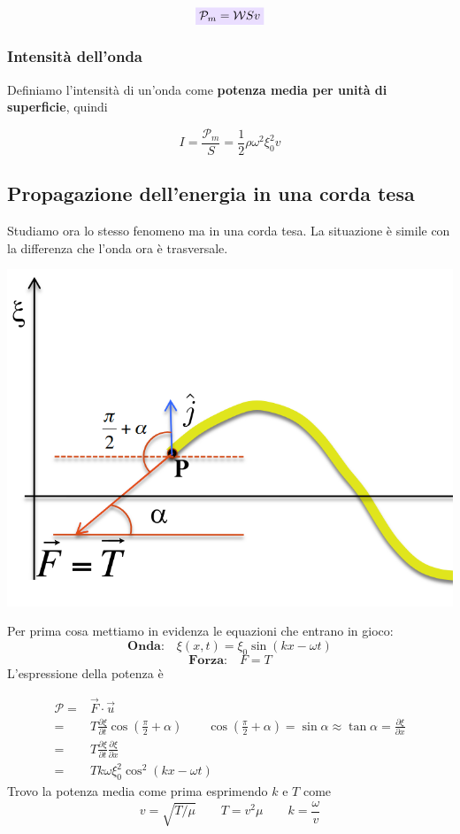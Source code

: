\documentclass[x11names]{report}
\newcommand{\viola}[1]{\colorbox{yred}{$\displaystyle #1$}}
\begin{document}
	\begin{equation}
		\viola{\mathcal{P}_m = \mathcal{W}S v}
	\end{equation}
	
	
	\subsubsection{Intensità dell'onda}
	Definiamo l'intensità di un'onda come  \textbf{potenza media per unità di superficie}, quindi
	
	\[
	I = \frac{\mathcal{P}_m}{S} = \frac{1}{2}\rho\omega^2\xi_0^2v
	\]
	
	\subsection{Propagazione dell'energia in una corda tesa}
	Studiamo ora lo stesso fenomeno ma in una corda tesa. La situazione è simile con la differenza che l'onda ora è trasversale.
	
	\begin{center}
		\includegraphics[scale=0.35]{imgs/energiacorda.png}
	\end{center}
	
	\noindent
	Per prima cosa mettiamo in evidenza le equazioni che entrano in gioco:
	\[ 
	\textbf{Onda:} \quad \xi(x,t) = \xi_0\sin\left(kx - \omega t\right)
	\]
	\[ 
	\textbf{Forza:} \quad F = T
	\]
	L'espressione della potenza è 
	
	\begin{align*}
		\mathcal{P} =& \vec{F} \cdot \vec{u} \\
		=& T\frac{\partial\xi}{\partial t}\cos{\left(\frac{\pi}{2} + \alpha\right)} \qquad  \cos{\left(\frac{\pi}{2} + \alpha\right)} = \sin{\alpha} \approx \tan\alpha = \frac{\partial\xi}{\partial x} \\
		= & T\frac{\partial\xi}{\partial t}\frac{\partial\xi}{\partial x} \\
		=& Tk\omega \xi_0^2\cos^2\left(kx-\omega t\right)
	\end{align*}
	Trovo la potenza media come prima esprimendo \(k\) e \(T\) come
	\[ 
	\boxed{v = \sqrt{T/\mu} \qquad T = v^2 \mu} \qquad \boxed{k = \frac{\omega}{v}}
	\]
	
\end{document}
